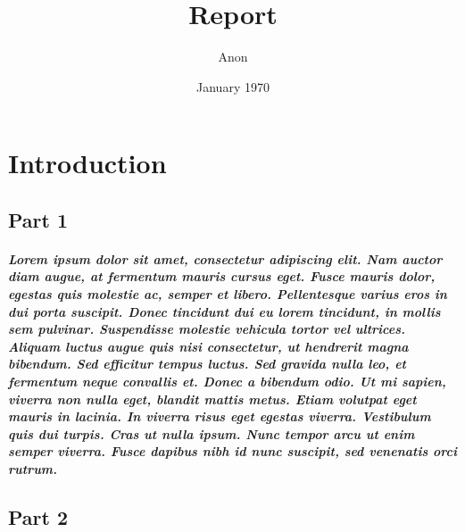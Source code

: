\documentclass[12pt]{report}
\title{Report}
\author{Anon}
\date{January 1970}
\begin{document}
    \maketitle


    \tableofcontents

    \titleformat{\chapter}[display]
    {\normalfont\bfseries\Huge}{}{0pt}{\thechapter\quad}
    \titlespacing*{\chapter}{0pt}{50pt}{20pt}

    \chapter{Introduction}

        \section{Part 1}
        \paragraph{Lorem ipsum dolor sit amet, consectetur adipiscing elit. Nam auctor diam augue, at fermentum mauris cursus eget. Fusce mauris dolor, egestas quis molestie ac, semper et libero. Pellentesque varius eros in dui porta suscipit. Donec tincidunt dui eu lorem tincidunt, in mollis sem pulvinar. Suspendisse molestie vehicula tortor vel ultrices. Aliquam luctus augue quis nisi consectetur, ut hendrerit magna bibendum. Sed efficitur tempus luctus. Sed gravida nulla leo, et fermentum neque convallis et. Donec a bibendum odio. Ut mi sapien, viverra non nulla eget, blandit mattis metus. Etiam volutpat eget mauris in lacinia. In viverra risus eget egestas viverra. Vestibulum quis dui turpis. Cras ut nulla ipsum. Nunc tempor arcu ut enim semper viverra. Fusce dapibus nibh id nunc suscipit, sed venenatis orci rutrum. }
        \section{Part 2}
    
\end{document}
